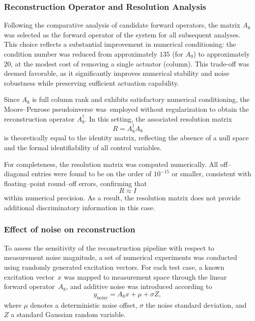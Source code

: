 \subsubsection{Reconstruction Operator and Resolution Analysis}

Following the comparative analysis of candidate forward operators, the matrix $A_8$ was selected as the forward operator of the system for all subsequent analyses. 
This choice reflects a substantial improvement in numerical conditioning: the condition number was reduced from approximately $135$ (for $A_9$) to approximately $20$, at the modest cost of removing a single actuator (column). 
This trade-off was deemed favorable, as it significantly improves numerical stability and noise robustness while preserving sufficient actuation capability.

Since $A_8$ is full column rank and exhibits satisfactory numerical conditioning, the Moore--Penrose pseudoinverse was\
employed without regularization to obtain the reconstruction operator $A_8^{\dagger}$. 
In this setting, the associated resolution matrix
\[
R = A_8^{\dagger} A_8
\]
is theoretically equal to the identity matrix, reflecting the absence of a null space and the formal identifiability of all control variables.

For completeness, the resolution matrix was computed numerically. All off--diagonal entries were found to be on the order of $10^{-15}$ or smaller, consistent with floating--point round--off errors, confirming that
\[
R \approx I
\]
within numerical precision. As a result, the resolution matrix does not provide additional discriminatory information in this case.


\subsubsection{Effect of noise on reconstruction}
To assess the sensitivity of the reconstruction pipeline with respect to measurement noise magnitude, a set of numerical experiments was conducted using randomly generated excitation vectors. For each test case, a known excitation vector~$x$ was mapped to measurement space through the linear forward operator~$A_8$, and additive noise was introduced according to
\begin{equation}
    y_{\text{noisy}} = A_8 x + \mu + \sigma Z,
\end{equation}
where $\mu$ denotes a deterministic noise offset, $\sigma$ the noise standard deviation, and $Z$ a standard Gaussian random variable.

